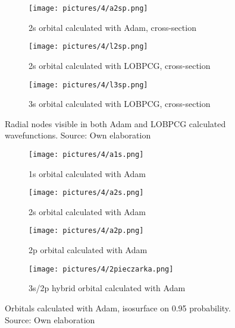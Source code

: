\begin{figure}[h]
	\centering
	\begin{subfigure}[b]{0.45\textwidth}
		\centering
		\texttt{[image: pictures/4/a2sp.png]}
		\caption{2s orbital calculated with Adam, cross-section}
		\label{fig:a2sp}
	\end{subfigure}
	\hfill
	\begin{subfigure}[b]{0.45\textwidth}
		\centering
		\texttt{[image: pictures/4/l2sp.png]}
		\caption{2s orbital calculated with LOBPCG, cross-section}
		\label{fig:l2sp}
	\end{subfigure}
	\hfill
	
	\bigskip
	
	\begin{subfigure}[b]{0.45\textwidth}
		\centering
		\texttt{[image: pictures/4/l3sp.png]}
		\caption{3s orbital calculated with LOBPCG, cross-section}
		\label{fig:l3sp}
	\hfill
	\end{subfigure}
	\caption{Radial nodes visible in both Adam and LOBPCG calculated wavefunctions. Source: Own elaboration}
	\label{fig:isosurfaces-cross-section}
\end{figure} 

\begin{figure}[ht!]
	\centering
	\begin{subfigure}[b]{0.45\textwidth}
		\centering
		\texttt{[image: pictures/4/a1s.png]}
		\caption{1s orbital calculated with Adam}
		\label{fig:a1s}
	\end{subfigure}
	\hfill
	\begin{subfigure}[b]{0.45\textwidth}
		\centering
		\texttt{[image: pictures/4/a2s.png]}
		\caption{2s orbital calculated with Adam}
		\label{fig:a2s}
	\end{subfigure}
	\hfill
	
	\bigskip
	
	\begin{subfigure}[b]{0.45\textwidth}
		\centering
		\texttt{[image: pictures/4/a2p.png]}
		\caption{2p orbital calculated with Adam}
		\label{fig:a2px}
	\end{subfigure}
	\hfill
	\begin{subfigure}[b]{0.45\textwidth}
		\centering
		\texttt{[image: pictures/4/2pieczarka.png]}
		\caption{3s/2p hybrid orbital calculated with Adam}
		\label{fig:a2p}
	\end{subfigure}
	\hfill
	
	\caption{Orbitals calculated with Adam, isosurface on 0.95 probability. Source: Own elaboration}
	\label{fig:adam-isosurfaces}
\end{figure} 

